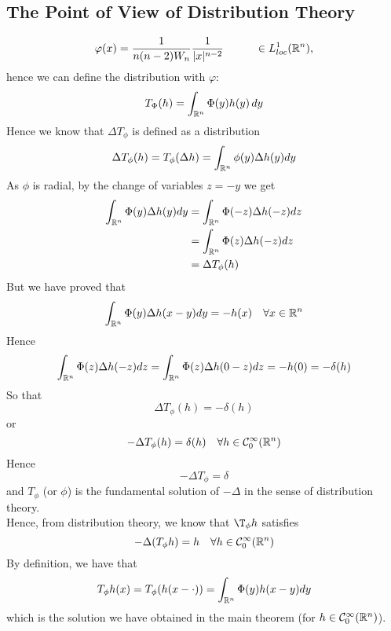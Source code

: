 \subsection{The Point of View of Distribution Theory}
\begin{equation*}
    \varphi (x)= \frac{1}{n(n-2) W_n}\frac{1}{|x|^{n-2}} \hspace{1 cm} \in L_{loc}^1(\mathbb{R}^n),
\end{equation*}
hence we can define the distribution with $\varphi$:
\begin{equation*}
    T_{\Phi}(h)= \int_{\mathbb{R}^n} \Phi (y) h(y) \, dy 
\end{equation*}
Hence we know that $\Delta T_\phi$ is defined as a distribution
\begin{equation*}
    \Delta T_\phi(h) = T_\phi (\Delta h) = \int_{\mathbb{R}^n} \phi(y) \Delta h(y) dy
\end{equation*}
As $\phi$ is radial, by the change of variables $z = -y$ we get
\begin{align*}
    \int_{\mathbb{R}^n} \Phi(y) \Delta h(y)dy &= \int_{\mathbb{R}^n} \Phi(-z) \Delta h(-z) dz \\
    &= \int_{\mathbb{R}^n} \Phi(z) \Delta h(-z) dz \\
    &= \Delta T_\phi(h)
\end{align*}
But we have proved that 
\begin{equation*}
    \int_{\mathbb{R}^n} \Phi(y) \Delta h(x-y)dy = -h(x) \quad \forall x \in \mathbb{R}^n
\end{equation*}
Hence
\begin{equation*}
    \int_{\mathbb{R}^n} \Phi(z) \Delta h(-z)dz = \int_{\mathbb{R}^n} \Phi(z) \Delta h(0-z)dz = -h(0) = - \delta (h)
\end{equation*}
So that 
\begin{equation*}
    \Delta T_\phi(h) = -\delta(h)
\end{equation*}
or 
\begin{equation*}
    -\Delta T_\phi(h) = \delta(h) \quad \forall h \in \mathcal{C}^\infty_0 (\mathbb{R}^n)
\end{equation*}
Hence
\begin{equation*}
    -\Delta T_\phi = \delta
\end{equation*}
and $T_\phi$ (or $\phi$) is the fundamental solution of $-\Delta$ in the sense of distribution theory. \\
Hence, from distribution theory, we know that $\T_\phi \* h$ satisfies 
\begin{equation*}
    -\Delta (T_\phi \* h) = h \quad \forall h \in \mathcal{C}^\infty_0 (\mR^n)
\end{equation*}
By definition, we have that 
\begin{equation*}
    T_\phi \* h(x) = T_\phi(h(x-\cdot)) = \int_{\mR^n} \Phi(y) h(x-y) dy
\end{equation*}
which is the solution we have obtained in the main theorem (for $h \in \mathcal{C}^\infty_0(\mathbb{R}^n)$). 
